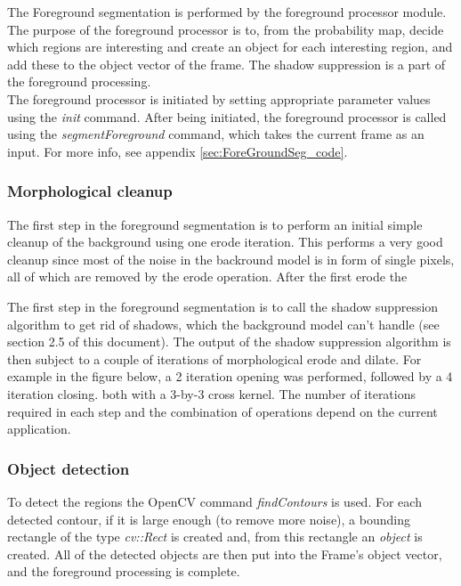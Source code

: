 The Foreground segmentation is performed by the foreground processor module. The purpose of the foreground processor is to, from the probability map, decide which regions are interesting and create an object for each interesting region, and add these to the object vector of the frame. The shadow suppression is a part of the foreground processing. \\
\newline
The foreground processor is initiated by setting appropriate parameter values using the \emph{init} command. After being initiated, the foreground processor is called using the \emph{segmentForeground} command, which takes the current frame as an input. For more info, see appendix \ref{sec:ForeGroundSeg_code}.

\subsubsection{Morphological cleanup}
The first step in the foreground segmentation is to perform an initial simple cleanup of the background using one erode iteration. This performs a very good cleanup since most of the noise in the backround model is in form of single pixels, all of which are removed by the erode operation. After the first erode the 

The first step in the foreground segmentation is to call the shadow suppression algorithm to get rid of shadows, which the background model can't handle (see section 2.5 of this document). The output of the shadow suppression algorithm is then subject to a couple of iterations of morphological erode and dilate. For example in the figure below, a 2 iteration opening was performed, followed by a 4 iteration closing. both with a 3-by-3 cross kernel. The number of iterations required in each step and the combination of operations depend on the current application.


\subsubsection{Object detection}
To detect the regions the OpenCV command \emph{findContours} is used. For each detected contour, if it is large enough (to remove more noise), a bounding rectangle of the type \emph{cv::Rect} is created and, from this rectangle an \emph{object} is created. All of the detected objects are then put into the Frame's object vector, and the foreground processing is complete.